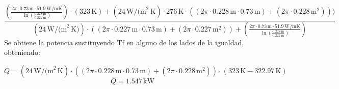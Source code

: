 \[\frac{\left(\frac{{2\pi \cdot 0.73 \, \text{m} \cdot 51.9 \, \text{W/mK}}}{{\ln\left(\frac{{0.228 \, \text{m}}}{{0.227 \, \text{m}}}\right)}}\right) \cdot (323 \, \text{K})
+ (24 \, \text{W/(m}^2 \, \text{K}) \cdot 276 \, \text{K} \cdot \left((2\pi \cdot 0.228 \, \text{m} \cdot 0.73 \, \text{m}) + (2\pi \cdot 0.228 \, \text{m}^2)\right))
}{\left(24 \, \text{W/(m}^2 \, \text{K})\right) \cdot \left(\left(2\pi \cdot 0.227 \, \text{m} \cdot 0.73 \, \text{m}\right) + \left(2\pi \cdot 0.227 \, \text{m}^2\right)\right) + \left(\frac{{2\pi \cdot 0.73 \, \text{m} \cdot 51.9 \, \text{W/mK}}}{{\ln\left(\frac{{0.228 \, \text{m}}}{{0.227 \, \text{m}}}\right)}}\right)
}
\]
Se obtiene la potencia sustituyendo Tf en alguno de los lados de la igualdad, obteniendo:

\[Q = \left(24 \, \text{W/(m}^2 \, \text{K}\right) \cdot \left(\left(2\pi \cdot 0.228 \, \text{m} \cdot 0.73 \, \text{m}\right) + \left(2\pi \cdot 0.228 \, \text{m}^2\right)\right) \cdot (323 \, \text{K} - 322.97 \, \text{K})
\]
\[Q = 1.547 \, \text{kW}
\]
